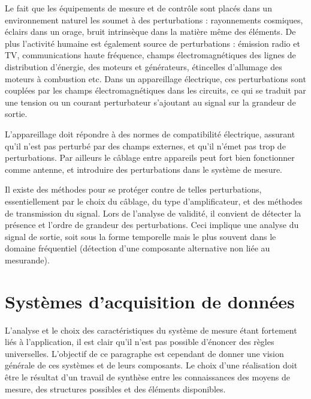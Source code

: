 Le fait que les équipements de mesure et de contrôle sont placés dans un environnement naturel les soumet à des perturbations : rayonnements cosmiques, éclairs dans un orage, bruit intrinsèque dans la matière même des éléments. De plus l'activité humaine est également source de perturbations : émission radio et TV, communications haute fréquence, champs électromagnétiques des lignes de distribution d'énergie, des moteurs et générateurs, étincelles d'allumage des moteurs à combustion etc. Dans un appareillage électrique, ces perturbations sont couplées par les champs électromagnétiques dans les circuits, ce qui se traduit par une tension ou un courant perturbateur s'ajoutant au signal sur la grandeur de sortie.

L'appareillage doit répondre à des normes de compatibilité électrique, assurant qu'il n'est pas perturbé par des champs externes, et qu'il n'émet pas trop de perturbations. Par ailleurs le câblage entre appareils peut fort bien fonctionner comme antenne, et introduire des perturbations dans le système de mesure.

Il existe des méthodes pour se protéger contre de telles perturbations, essentiellement par le choix du câblage, du type d'amplificateur, et des méthodes de transmission du signal. Lors de l'analyse de validité, il convient de détecter la présence et l'ordre de grandeur des perturbations. Ceci implique une analyse du signal de sortie, soit sous la forme temporelle mais le plus souvent dans le domaine fréquentiel (détection d'une composante alternative non liée au mesurande).

\section{Systèmes d'acquisition de données}

\begin{center}
\end{center}
L'analyse et le choix des caractéristiques du système de mesure étant fortement liés à l'application, il est clair qu'il n'est pas possible d'énoncer des règles universelles. L'objectif de ce paragraphe est cependant de donner une vision générale de ces systèmes et de leurs composants. Le choix d'une réalisation doit être le résultat d'un travail de synthèse entre les connaissances des moyens de mesure, des structures possibles et des éléments disponibles.

